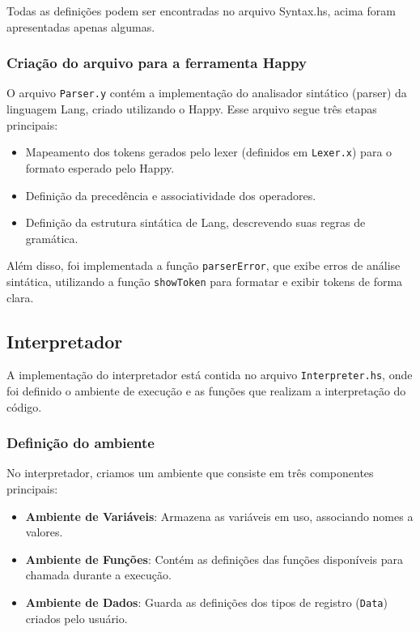 \documentclass{article}
\begin{document}
Todas as definições podem ser encontradas no arquivo Syntax.hs, acima foram apresentadas apenas algumas.

\subsubsection{Criação do arquivo para a ferramenta Happy}

O arquivo \texttt{Parser.y} contém a implementação do analisador sintático (parser) da linguagem Lang, criado utilizando o Happy. Esse arquivo segue três etapas principais:

\begin{itemize}
    \item Mapeamento dos tokens gerados pelo lexer (definidos em \texttt{Lexer.x}) para o formato esperado pelo Happy.
    \item Definição da precedência e associatividade dos operadores.
    \item Definição da estrutura sintática de Lang, descrevendo suas regras de gramática.
\end{itemize}

Além disso, foi implementada a função \texttt{parserError}, que exibe erros de análise sintática, utilizando a função \texttt{showToken} para formatar e exibir tokens de forma clara.

\subsection{Interpretador}\label{desenvolvimento:interpreter}

A implementação do interpretador está contida no arquivo \texttt{Interpreter.hs}, onde foi definido o ambiente de execução e as funções que realizam a interpretação do código.

\subsubsection{Definição do ambiente}

No interpretador, criamos um ambiente que consiste em três componentes principais:

\begin{itemize}
    \item \textbf{Ambiente de Variáveis}: Armazena as variáveis em uso, associando nomes a valores.
    \item \textbf{Ambiente de Funções}: Contém as definições das funções disponíveis para chamada durante a execução.
    \item \textbf{Ambiente de Dados}: Guarda as definições dos tipos de registro (\texttt{Data}) criados pelo usuário.
\end{itemize}
\end{document}
